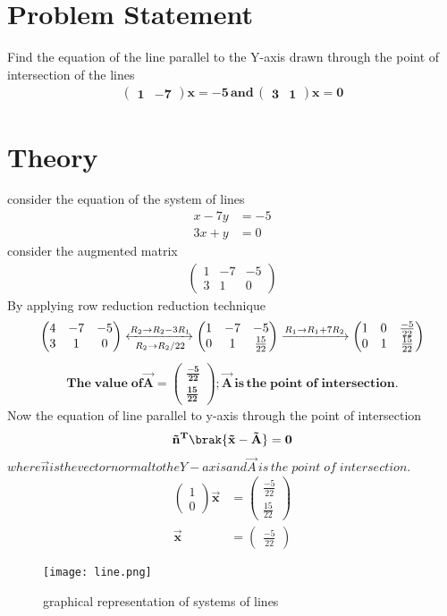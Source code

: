 \documentclass{article}
\newcommand{\myvec}[1]{\ensuremath{\begin{pmatrix}#1\end{pmatrix}}}
\begin{document}
\section{Problem Statement}
Find the equation of the line parallel to the Y-axis drawn through the point of intersection of the lines
\begin{align}
\mathbf{\myvec{1 & -7}x  =-5 \, and \, \myvec{3 & 1}x  = 0}
\end{align}
\section{Theory}
consider the equation of the system of lines
\begin{align}
x - 7y & = -5 \\
3x + y & = 0
\end{align}
 consider the augmented matrix
 \begin{align}
 \myvec{1 & -7 & -5 \\ 3 & 1 & 0}
 \end{align}
 By applying row reduction reduction technique \\
 \begin{align}
\myvec{4 & -7 & -5\\ 3 & 1 & 0}
	\xleftrightarrow[R_2 \rightarrow R_2/22]{R_2 \rightarrow R_2-3R_1}
	\myvec{1 & -7 & -5 \\ 0 & 1 & \frac{15}{22}}
	\xrightarrow[]{R_1 \rightarrow R_1+7R_2}
	 \myvec{1 & 0 & \frac{-5}{22} \\ 0 & 1 & \frac{15}{22}}
 \end{align}
\begin{align}
\mathbf{The\; value\; of\vec{A} = \myvec{\frac{-5}{22} \\ \frac{15}{22}} ;
\vec{A} \,is\, the\; point\; of \;intersection.}
\end{align}
 Now the equation of line parallel to y-axis through the point of intersection\\
\begin{align}
 \mathbf{\vec{n}^T\brak{\vec{x}-\vec{A}} = 0}
\end{align}
$where \vec{n}  is the vector normal to the Y - axis and\vec{A}\, is\, the\; point\; of\; intersection.$
\begin{align}
\myvec{1 \\ 0}\bm{\vec{x}} & = \myvec{ \frac{-5}{22}\\ \frac{15}{22}}
 \\
\bm{\vec{x}} & = \myvec{\frac{-5}{22}} 
 \end{align}
 \begin{figure}
 \centering
 \texttt{[image: line.png]}
 \caption{graphical representation of systems of lines}
 \end{figure}
\end{document}
